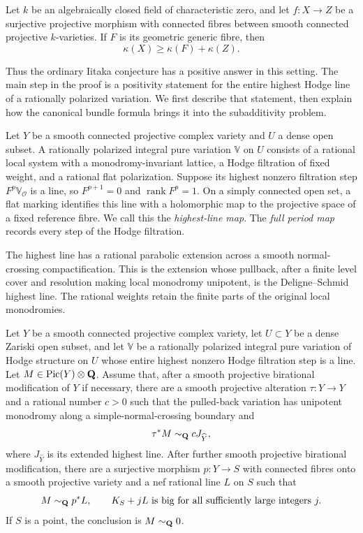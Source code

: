 \begin{theorem}\label{thm:ordinary}\label{altord:ordinary-subadditivity}
Let $k$ be an algebraically closed field of characteristic zero, and
let $f:X\to Z$ be a surjective projective morphism with connected
fibres between smooth connected projective $k$-varieties. If $F$ is
its geometric generic fibre, then
\[
                     \kappa(X)\geq\kappa(F)+\kappa(Z).
\]
\end{theorem}

Thus the ordinary Iitaka conjecture has a positive answer in this
setting. The main step in the proof is a positivity statement for
the entire highest Hodge line of a rationally polarized variation.
We first describe that statement, then explain how the canonical
bundle formula brings it into the subadditivity problem.

Let $Y$ be a smooth connected projective complex variety and $U$ a
dense open subset. A rationally polarized integral pure variation
$\mathbb V$ on $U$ consists of a rational local system with a
monodromy-invariant lattice, a Hodge filtration of fixed weight, and
a rational flat polarization. Suppose its highest nonzero
filtration step $F^p\mathbb V_{\mathcal O}$ is a line, so
$F^{p+1}=0$ and $\operatorname{rank}F^p=1$. On a simply connected
open set, a flat marking identifies this line with a holomorphic
map to the projective space of a fixed reference fibre. We call
this the \emph{highest-line map}. The \emph{full period map}
records every step of the Hodge filtration.

The highest line has a rational parabolic extension across a smooth
normal-crossing compactification. This is the extension whose pullback,
after a finite level cover and resolution making local monodromy
unipotent, is the Deligne--Schmid highest line. The rational weights
retain the finite parts of the original local monodromies.

\begin{theorem}\label{thm:adjoint}\label{altord:p:observation}
Let $Y$ be a smooth connected projective complex variety, let
$U\subset Y$ be a dense Zariski open subset, and let $\mathbb V$
be a rationally polarized integral pure variation of Hodge structure
on $U$ whose entire highest nonzero Hodge filtration step is a line.
Let $M\in\operatorname{Pic}(Y)\otimes\mathbf Q$. Assume that, after a smooth
projective birational modification of $Y$ if necessary, there are a
smooth projective alteration $\tau:\widehat Y\to Y$ and a rational
number $c>0$ such that the pulled-back variation has unipotent
monodromy along a simple-normal-crossing boundary and
\[
                     \tau^*M\sim_{\mathbf Q}cJ_{\widehat Y},
\]
where $J_{\widehat Y}$ is its extended highest line.
After further smooth projective birational modification, there are a
surjective morphism $p:Y\to S$ with connected fibres onto a smooth
projective variety and a nef rational line $L$ on $S$ such that
\[
 M\sim_{\mathbf Q}p^*L,\qquad
 K_S+jL\text{ is big for all sufficiently large integers }j.
\]
If $S$ is a point, the conclusion is $M\sim_{\mathbf Q}0$.
\end{theorem}

